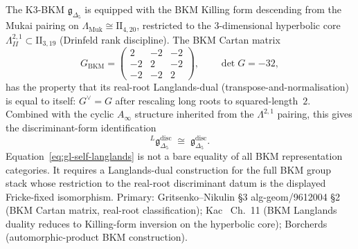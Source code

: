 \begin{remark}
\label{rem:gl-self-langlands-dual}
The K3-BKM $\mathfrak{g}_{\Delta_5}$ is equipped with the BKM Killing
form descending from the Mukai pairing on $\Lambda_{\mathrm{Muk}}
\cong \mathrm{II}_{4,20}$, restricted to the $3$-dimensional
hyperbolic core $\Lambda^{2,1}_{II} \subset \mathrm{II}_{3,19}$ (Drinfeld rank discipline). The BKM Cartan matrix
\[
 G_{\mathrm{BKM}} = \begin{pmatrix} 2 & -2 & -2 \\ -2 & 2 & -2 \\ -2 & -2 & 2 \end{pmatrix},
 \qquad \det G = -32,
\]
has the property that its real-root Langlands-dual
(transpose-and-normalisation) is equal to itself: $G^{\vee} = G$
after rescaling long roots to squared-length~$2$. Combined with
the cyclic $A_\infty$ structure inherited from the $\Lambda^{2,1}$
pairing, this gives the discriminant-form identification
\begin{equation}
\label{eq:gl-self-langlands}
 {}^L\mathfrak{g}_{\Delta_5}^{\mathrm{disc}} \;\cong\;
 \mathfrak{g}_{\Delta_5}^{\mathrm{disc}}.
\end{equation}
Equation~\eqref{eq:gl-self-langlands} is not a bare equality of all
BKM representation categories. It requires a
Langlands-dual construction for the full BKM group stack whose restriction
to the real-root discriminant datum is the displayed Fricke-fixed
isomorphism. Primary: Gritsenko--Nikulin
\cite{GritsenkoNikulin1998Automorphic} \S3
alg-geom/9612004 \S2 (BKM Cartan matrix, real-root classification);
Kac~\cite{Kac1990InfiniteDim} Ch.~11 (BKM Langlands duality reduces
to Killing-form inversion on the hyperbolic core); Borcherds~\cite{Borcherds1998Autforms}
(automorphic-product BKM construction).
\end{remark}

